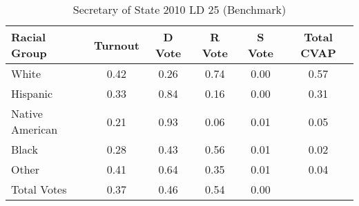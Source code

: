 \begin{table}[htb]
\begin{center}
\caption{Secretary of State 2010 LD 25 (Benchmark)}
\label{sos10_cvap_ld_25_benchmark}
\begin{tabular}{lccccc}
  \hline
Racial Group & Turnout & D Vote & R Vote & S Vote & Total CVAP \\ 
  \hline
White & 0.42 & 0.26 & 0.74 & 0.00 & 0.57 \\ 
  Hispanic & 0.33 & 0.84 & 0.16 & 0.00 & 0.31 \\ 
  Native American & 0.21 & 0.93 & 0.06 & 0.01 & 0.05 \\ 
  Black & 0.28 & 0.43 & 0.56 & 0.01 & 0.02 \\ 
  Other & 0.41 & 0.64 & 0.35 & 0.01 & 0.04 \\ 
  Total Votes & 0.37 & 0.46 & 0.54 & 0.00 &  \\ 
   \hline
\end{tabular}
\end{center}
\end{table}
